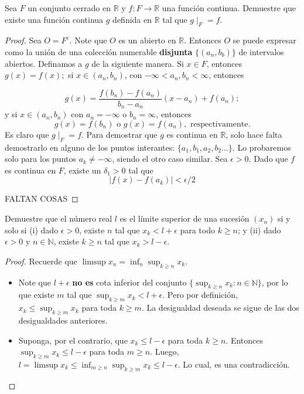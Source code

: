 \documentclass[12pt]{article}
\newcommand{\N}{\mathbb{N}}
\newcommand{\R}{\mathbb{R}}
\newenvironment{problem}[2][Problema]{\begin{trivlist}
\item[\hskip \labelsep {\bfseries #1}\hskip \labelsep {\bfseries #2.}]}{\end{trivlist}}
\begin{document}
\begin{problem}{11}
Sea $F$ un conjunto cerrado en $\R$ y $f: F \rightarrow \R$ una función continua. Demuestre que existe una función continua $g$ definida en $\R$ tal que $g\mid_F = f.$
\end{problem}
\begin{proof}
Sea $O = F^c$. Note que $O$ es un abierto en $\R$. Entonces $O$ se puede expresar como la unión de una colección numerable \textbf{disjunta} $\{ (a_n, b_b) \}$ de intervalos abiertos. Definamos a $g$ de la siguiente manera. Si $x \in F$, entonces $g(x) = f(x);$ si $x \in (a_n, b_n)$, con $-\infty < a_n, b_n < \infty$, entonces

$$g(x) = \frac{f(b_n) - f(a_n)}{b_n - a_n} (x - a_n) + f(a_n);$$
y si $x \in (a_n, b_n)$ con $a_n = -\infty$ o $b_n = \infty$, entonces
$$ g(x) = f(b_n) \text{ o } g(x) = f(a_n), \text{ respectivamente.}$$
Es claro que $g\mid_F = f.$ Para demostrar que $g$ es continua en $\R$, solo hace falta demostrarlo en alguno de los puntos interantes: $\{ a_1, b_1, a_2, b_2 \ldots \}$. Lo probaremos solo para los puntos $a_k \neq - \infty$, siendo el otro caso similar. Sea $\epsilon > 0$. Dado que $f$ es continua en $F$, existe un $\delta_1 > 0$ tal que
$$\lvert f(x) - f(a_k) \rvert < \epsilon/2 $$

FALTAN COSAS
\end{proof}

\begin{problem}{12}
Demuestre que el número real $l$ es el límite superior de una sucesión $(x_n)$ si y solo si (i) dado $\epsilon > 0 $, existe $n$ tal que $x_k < l + \epsilon$ para todo $k \geq n$; y (ii) dado $\epsilon > 0$ y $n\in \N$, existe $k \geq n$ tal que $x_k > l - \epsilon$. 
\end{problem}
\begin{proof} Recuerde que $\limsup x_n = \inf_{n} \sup_{k \geq n} x_k$.
    \begin{itemize}
        \item[i)] Note que $l + \epsilon$ \textbf{no es} cota inferior del conjunto $\{ \sup_{k \geq n} x_k:  n \in \N \}$, por lo que existe $m$ tal que 
        $\sup_{k \geq m} x_k < l + \epsilon.$ Pero por definición, $x_k \leq \sup_{k \geq m} x_k$ para toda $k \geq m$. La desigualdad deseada se sigue de las dos desigualdades anteriores. 
        \item[ii)] Suponga, por el contrario, que $x_k \leq l - \epsilon$ para toda $k \geq n.$ Entonces $\sup_{k \geq m} x_k \leq l - \epsilon$ para toda $m \geq n.$ Luego, $l = \limsup x_k \leq \inf_{m \geq n} \sup_{k \geq m} x_k \leq l - \epsilon.$ Lo cual, es una contradicción.
    \end{itemize} 
\end{proof}
\end{document}
